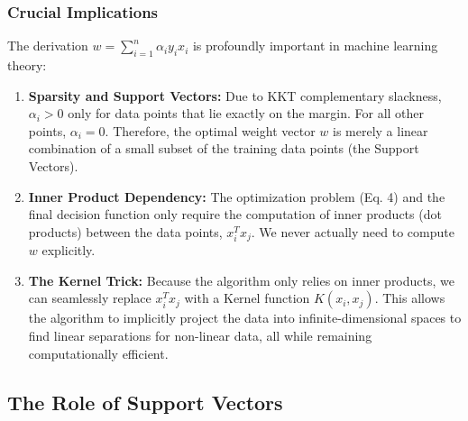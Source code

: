 \documentclass[twoside, 10pt]{article}
\begin{document}
\subsubsection{Crucial Implications}
The derivation $w = \sum_{i=1}^n \alpha_i y_i x_i$ is profoundly important in machine learning theory:
\begin{enumerate}
    \item \textbf{Sparsity and Support Vectors:} Due to KKT complementary slackness, $\alpha_i > 0$ only for data points that lie exactly on the margin. For all other points, $\alpha_i = 0$. Therefore, the optimal weight vector $w$ is merely a linear combination of a small subset of the training data points (the Support Vectors).
    \item \textbf{Inner Product Dependency:} The optimization problem (Eq. 4) and the final decision function only require the computation of inner products (dot products) between the data points, $x_i^T x_j$. We never actually need to compute $w$ explicitly.
    \item \textbf{The Kernel Trick:} Because the algorithm only relies on inner products, we can seamlessly replace $x_i^T x_j$ with a Kernel function $K(x_i, x_j)$. This allows the algorithm to implicitly project the data into infinite-dimensional spaces to find linear separations for non-linear data, all while remaining computationally efficient.
\end{enumerate}

\subsection{The Role of Support Vectors}
\end{document}
